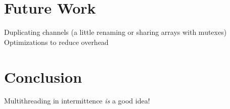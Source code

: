 \documentclass[11pt]{sensys-proc}
\begin{document}
\section{Future Work}
Duplicating channels (a little renaming or sharing arrays with mutexes)\\
Optimizations to reduce overhead\\


\section{Conclusion}
Multithreading in intermittence {\em is} a good idea!


\balance

\end{document}
